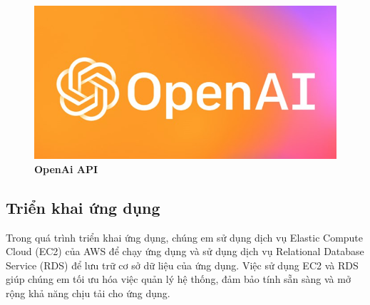 \begin{figure}[H]
  \centering
  \includegraphics[scale=0.9]{Images/server/ai/openai.png}
  \caption[OpenAi API]{\bfseries \fontsize{12pt}{0pt}
  \selectfont OpenAi API}
  \label{openai} %
\end{figure}


\subsection{Triển khai ứng dụng}
Trong quá trình triển khai ứng dụng, chúng em sử dụng dịch vụ Elastic Compute
 Cloud (EC2) của AWS để chạy ứng dụng và sử dụng dịch vụ Relational Database Service
  (RDS) để lưu trữ cơ sở dữ liệu của ứng dụng. Việc sử dụng EC2 và RDS giúp
   chúng em tối ưu hóa việc quản lý hệ thống, đảm bảo tính sẵn sàng và
    mở rộng khả năng chịu tải cho ứng dụng.

